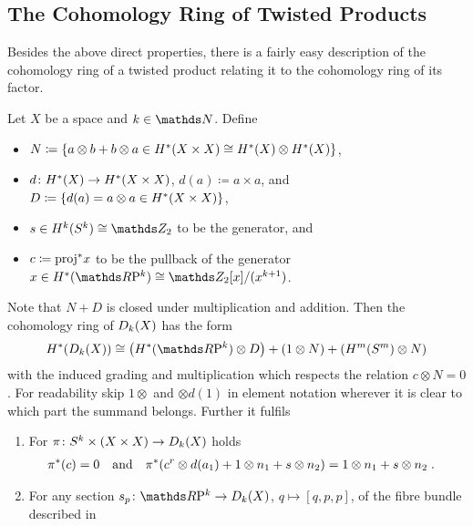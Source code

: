 \subsection{The Cohomology Ring of Twisted Products}
Besides the above direct properties, there is a fairly easy
description of the cohomology ring of a twisted product relating it to
the cohomology ring of its factor.
\begin{Thm}\label{thm:twistedprod:cohomstructure}%
  Let $X$ be a space and $k\in\Nat$.
  Define
  \begin{itemize}
  \item
    $N\coloneqq
    \left\{
        a\otimes b + b\otimes a
        \in H^*(X\times X)\cong H^*(X)\otimes H^*(X)
      \right\}$,
  \item
    $d\colon H^*(X)\to H^*(X\times X)$,
    $d(a)\coloneqq a\times a$, and
    $D\coloneqq
    \left\{ d(a)=a\otimes a \in H^*(X\times X) \right\}$,
  \item
    $s\in\H^k(\Sphere k)\cong\Zmod2$ to be the generator, and
  \item
    $c\coloneqq {\mathrm{proj}}^* x$ to be the pullback of the generator
    $x\in\H^*(\RP k)\cong\Zmod2[x]/(x^{k+1})$.
  \end{itemize}
  Note that $N+D$ is closed under multiplication and addition.
  Then the cohomology ring of $D_{k}({X})$ has the form
  \begin{gather*}
    \H^*(\Twistedprod{k}{X})
    \cong
    \left(\H^*(\RP k)\otimes D\right)
    + \left( 1\otimes N \right)
    + \left( \H^m(\Sphere m) \otimes N \right)
  \end{gather*}
  with the induced grading and multiplication which respects the
  relation $c\otimes N=0$.
  For readability skip $1\otimes$ and $\otimes d(1)$ in element
  notation wherever it is clear to which part the summand belongs.
  Further it fulfils
  \begin{enumerate}
  \item
    For $\pi\colon S^{k}\times(X\times X)\to D_{k}({X})$
    holds
    \begin{align}\label{eq:twistedprodcohom:pi}
      {\pi}^*(c)&=0
      &\text{and}&
      &{\pi}^*(c^r\otimes d(a_1) + 1\otimes n_1 + s\otimes n_2)
      &= 1\otimes n_1 + s\otimes n_2
        \;.
    \end{align}
  \item
    For any section $s_p\colon\RP k\to\Twistedprod{k}{X}$, $q\mapsto[q,p,p]$,
    of the fibre bundle described in

\end{enumerate}
\end{Thm}
